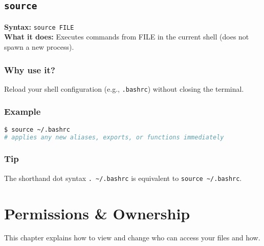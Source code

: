 \documentclass[10pt,oneside]{scrbook}
\begin{document}
\section{\texttt{source}}
\begin{cmdbox}
  \textbf{Syntax:} \lstinline!source FILE! \\
  \textbf{What it does:} Executes commands from FILE in the current shell (does not spawn a new process).
\end{cmdbox}
\begin{commanddetails}
  \subsection*{Why use it?}
    Reload your shell configuration (e.g., \texttt{.bashrc}) without closing the terminal.

  \subsection*{Example}
  \begin{lstlisting}[language=bash]
$ source ~/.bashrc
# applies any new aliases, exports, or functions immediately
  \end{lstlisting}

  \subsection*{Tip}
    The shorthand dot syntax \lstinline!. ~/.bashrc! is equivalent to \lstinline!source ~/.bashrc!.
\end{commanddetails}


\chapter{Permissions \& Ownership}

This chapter explains how to view and change who can access your files and how.

\end{document}
